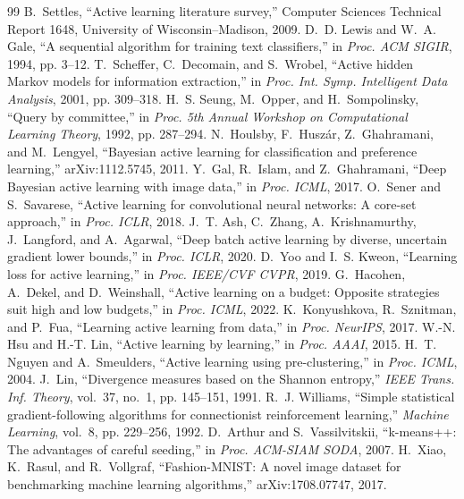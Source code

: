 \documentclass[conference,a4paper]{IEEEtran}
\begin{document}
\begin{thebibliography}{99}
 B.~Settles, ``Active learning literature survey,'' Computer Sciences Technical Report 1648, University of Wisconsin--Madison, 2009.
 D.~D. Lewis and W.~A. Gale, ``A sequential algorithm for training text classifiers,'' in \emph{Proc. ACM SIGIR}, 1994, pp. 3--12.
 T.~Scheffer, C.~Decomain, and S.~Wrobel, ``Active hidden {M}arkov models for information extraction,'' in \emph{Proc. Int. Symp. Intelligent Data Analysis}, 2001, pp. 309--318.
 H.~S. Seung, M.~Opper, and H.~Sompolinsky, ``Query by committee,'' in \emph{Proc. 5th Annual Workshop on Computational Learning Theory}, 1992, pp. 287--294.
 N.~Houlsby, F.~Husz\'ar, Z.~Ghahramani, and M.~Lengyel, ``Bayesian active learning for classification and preference learning,'' arXiv:1112.5745, 2011.
 Y.~Gal, R.~Islam, and Z.~Ghahramani, ``Deep {B}ayesian active learning with image data,'' in \emph{Proc. ICML}, 2017.
 O.~Sener and S.~Savarese, ``Active learning for convolutional neural networks: A core-set approach,'' in \emph{Proc. ICLR}, 2018.
 J.~T. Ash, C.~Zhang, A.~Krishnamurthy, J.~Langford, and A.~Agarwal, ``Deep batch active learning by diverse, uncertain gradient lower bounds,'' in \emph{Proc. ICLR}, 2020.
 D.~Yoo and I.~S. Kweon, ``Learning loss for active learning,'' in \emph{Proc. IEEE/CVF CVPR}, 2019.
 G.~Hacohen, A.~Dekel, and D.~Weinshall, ``Active learning on a budget: Opposite strategies suit high and low budgets,'' in \emph{Proc. ICML}, 2022.
 K.~Konyushkova, R.~Sznitman, and P.~Fua, ``Learning active learning from data,'' in \emph{Proc. NeurIPS}, 2017.
 W.-N. Hsu and H.-T. Lin, ``Active learning by learning,'' in \emph{Proc. AAAI}, 2015.
 H.~T. Nguyen and A.~Smeulders, ``Active learning using pre-clustering,'' in \emph{Proc. ICML}, 2004.
 J.~Lin, ``Divergence measures based on the {S}hannon entropy,'' \emph{IEEE Trans. Inf. Theory}, vol.~37, no.~1, pp. 145--151, 1991.
 R.~J. Williams, ``Simple statistical gradient-following algorithms for connectionist reinforcement learning,'' \emph{Machine Learning}, vol.~8, pp. 229--256, 1992.
 D.~Arthur and S.~Vassilvitskii, ``k-means++: The advantages of careful seeding,'' in \emph{Proc. ACM-SIAM SODA}, 2007.
 H.~Xiao, K.~Rasul, and R.~Vollgraf, ``Fashion-{MNIST}: A novel image dataset for benchmarking machine learning algorithms,'' arXiv:1708.07747, 2017.

\end{thebibliography}
\end{document}
